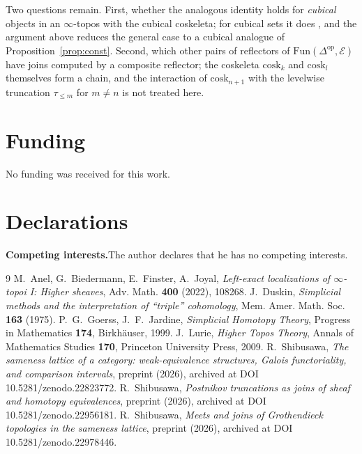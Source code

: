 \documentclass[11pt]{amsart}
\theoremstyle{definition}
\newcommand{\cosk}{\mathrm{cosk}}
\newcommand{\Fun}{\mathrm{Fun}}
\newcommand{\E}{\mathcal E}
\newcommand{\tr}[1]{\tau_{\le #1}}
\begin{document}
Two questions remain. First, whether the analogous identity holds for
\emph{cubical} objects in an $\infty$-topos with the cubical coskeleta; for
cubical sets it does \cite{Postnikov}, and the argument above reduces the
general case to a cubical analogue of Proposition~\ref{prop:const}. Second,
which other pairs of reflectors of $\Fun(\Delta^{\mathrm{op}},\E)$ have joins
computed by a composite reflector; the coskeleta $\cosk_{k}$ and $\cosk_{l}$
themselves form a chain, and the interaction of $\cosk_{n+1}$ with the
levelwise truncation $\tr m$ for $m\neq n$ is not treated here.

\section*{Funding}
No funding was received for this work.

\section*{Declarations}
\noindent\textbf{Competing interests.}\quad The author declares that he has no
competing interests.

\begin{thebibliography}{9}
 M.~Anel, G.~Biedermann, E.~Finster, A.~Joyal, \emph{Left-exact
localizations of $\infty$-topoi I: Higher sheaves}, Adv. Math. \textbf{400}
(2022), 108268.
 J.~Duskin, \emph{Simplicial methods and the interpretation
of ``triple'' cohomology}, Mem. Amer. Math. Soc. \textbf{163} (1975).
 P.~G.~Goerss, J.~F.~Jardine, \emph{Simplicial Homotopy Theory},
Progress in Mathematics \textbf{174}, Birkh\"auser, 1999.
 J.~Lurie, \emph{Higher Topos Theory}, Annals of Mathematics
Studies \textbf{170}, Princeton University Press, 2009.
 R.~Shibusawa, \emph{The sameness lattice of a category:
weak-equivalence structures, Galois functoriality, and comparison intervals},
preprint (2026), archived at DOI 10.5281/zenodo.22823772.
 R.~Shibusawa, \emph{Postnikov truncations as joins of sheaf
and homotopy equivalences}, preprint (2026), archived at DOI 10.5281/zenodo.22956181.
 R.~Shibusawa, \emph{Meets and joins of Grothendieck
topologies in the sameness lattice}, preprint (2026), archived at DOI
10.5281/zenodo.22978446.
\end{thebibliography}
\end{document}
